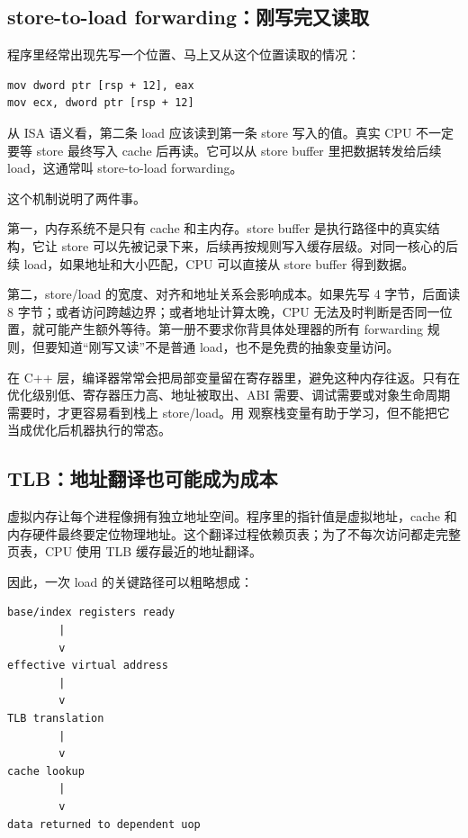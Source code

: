 \subsection{store-to-load forwarding：刚写完又读取}

程序里经常出现先写一个位置、马上又从这个位置读取的情况：

\begin{lstlisting}
mov dword ptr [rsp + 12], eax
mov ecx, dword ptr [rsp + 12]
\end{lstlisting}

从 ISA 语义看，第二条 load 应该读到第一条 store 写入的值。真实 CPU 不一定要等 store 最终写入 cache 后再读。它可以从 store buffer 里把数据转发给后续 load，这通常叫 store-to-load forwarding。

这个机制说明了两件事。

第一，内存系统不是只有 cache 和主内存。store buffer 是执行路径中的真实结构，它让 store 可以先被记录下来，后续再按规则写入缓存层级。对同一核心的后续 load，如果地址和大小匹配，CPU 可以直接从 store buffer 得到数据。

第二，store/load 的宽度、对齐和地址关系会影响成本。如果先写 4 字节，后面读 8 字节；或者访问跨越边界；或者地址计算太晚，CPU 无法及时判断是否同一位置，就可能产生额外等待。第一册不要求你背具体处理器的所有 forwarding 规则，但要知道“刚写又读”不是普通 load，也不是免费的抽象变量访问。

在 C++ 层，编译器常常会把局部变量留在寄存器里，避免这种内存往返。只有在优化级别低、寄存器压力高、地址被取出、ABI 需要、调试需要或对象生命周期需要时，才更容易看到栈上 store/load。用  观察栈变量有助于学习，但不能把它当成优化后机器执行的常态。

\subsection{TLB：地址翻译也可能成为成本}

虚拟内存让每个进程像拥有独立地址空间。程序里的指针值是虚拟地址，cache 和内存硬件最终要定位物理地址。这个翻译过程依赖页表；为了不每次访问都走完整页表，CPU 使用 TLB 缓存最近的地址翻译。

因此，一次 load 的关键路径可以粗略想成：

\begin{center}
\begin{minipage}{0.84\linewidth}
\begin{verbatim}
base/index registers ready
        |
        v
effective virtual address
        |
        v
TLB translation
        |
        v
cache lookup
        |
        v
data returned to dependent uop
\end{verbatim}
\end{minipage}
\end{center}

